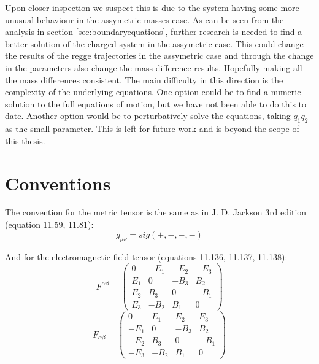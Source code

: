 \documentclass[11pt,a4paper]{article}
\begin{document}
Upon closer inspection we suspect this is due to the system having some more unusual behaviour in the assymetric masses case. As can be seen from the analysis in section \ref{sec:boundaryequations}, further research is needed to find a better solution of the charged system in the assymetric case. This could change the results of the regge trajectories in the assymetric case and through the change in the parameters also change the mass difference results. Hopefully making all the mass differences consistent. The main difficulty in this direction is the complexity of the underlying equations. One option could be to find a numeric solution to the full equations of motion, but we have not been able to do this to date. Another option would be to perturbatively solve the equations, taking $q_1q_2$ as the small parameter. This is left for future work and is beyond the scope of this thesis.
\appendix
\FloatBarrier
\section{Conventions}
The convention for the metric tensor is the same as in J. D. Jackson 3rd edition (equation 11.59, 11.81):
\begin{equation*}
g_{\mu\nu}=sig(+,-,-,-)
\end{equation*}

And for the electromagnetic field tensor (equations 11.136, 11.137, 11.138):
\begin{equation*}
F^{\alpha\beta}=\left(\begin{array}{cccc}
0 & -E_{1} & -E_{2} & -E_{3}\\
E_{1} & 0 & -B_{3} & B_{2}\\
E_{2} & B_{3} & 0 & -B_{1}\\
E_{3} & -B_{2} & B_{1} & 0
\end{array}\right)
\end{equation*}
\begin{equation*}
F_{\alpha\beta}=\left(\begin{array}{cccc}
0 & E_{1} & E_{2} & E_{3}\\
-E_{1} & 0 & -B_{3} & B_{2}\\
-E_{2} & B_{3} & 0 & -B_{1}\\
-E_{3} & -B_{2} & B_{1} & 0
\end{array}\right)
\end{equation*}
\FloatBarrier
\end{document}
